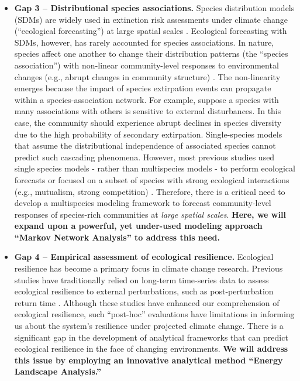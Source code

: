 \documentclass[12pt, class=article, crop=false]{standalone}
\begin{document}
\begin{itemize}
    \item \textbf{Gap 3 -- Distributional species associations.} Species distribution models (SDMs) are widely used in extinction risk assessments under climate change (``ecological forecasting'') at large spatial scales \citep{elith_species_2009, booth_species_2018}.
    Ecological forecasting with SDMs, however, has rarely accounted for species associations.
    In nature, species affect one another to change their distribution patterns (the ``species association'') \citep{pollock_understanding_2014, warton_so_2015, harris_inferring_2016} with non-linear community-level responses to environmental changes (e.g., abrupt changes in community structure) \citep{clark_more_2014, suzuki_energy_2021}.
    The non-linearity emerges because the impact of species extirpation events can propagate within a species-association network.
    For example, suppose a species with many associations with others is sensitive to external disturbances. In this case, the community should experience abrupt declines in species diversity due to the high probability of secondary extirpation.
    Single-species models that assume the distributional independence of associated species cannot predict such cascading phenomena. 
    However, most previous studies used single species models - rather than multispecies models - to perform ecological forecasts \citep{elith_species_2009, booth_species_2018} or focused on a subset of species with strong ecological interactions (e.g., mutualism, strong competition) \citep{araujo_importance_2007, wenger_flow_2011, polce_climate-driven_2014}.
    Therefore, there is a critical need to develop a multispecies modeling framework to forecast community-level responses of species-rich communities at \textit{large spatial scales}.
    \textbf{Here, we will expand upon a powerful, yet under-used modeling approach ``Markov Network Analysis'' to address this need.}

    \item \textbf{Gap 4 -- Empirical assessment of ecological resilience.} Ecological resilience has become a primary focus in climate change research.
    Previous studies have traditionally relied on long-term time-series data to assess ecological resilience to external perturbations, such as post-perturbation return time \citep{isbell_biodiversity_2015, hodgson_what_2015}.
    Although these studies have enhanced our comprehension of ecological resilience, such ``post-hoc'' evaluations have limitations in informing us about the system's resilience under projected climate change.
    There is a significant gap in the development of analytical frameworks that can predict ecological resilience in the face of changing environments.
    \textbf{We will address this issue by employing an innovative analytical method ``Energy Landscape Analysis.''}


\end{itemize}
\end{document}
